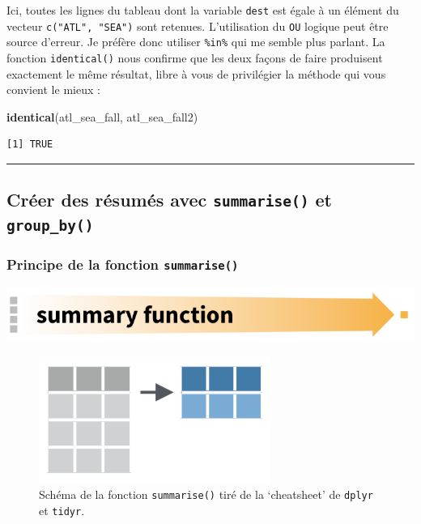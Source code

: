 \documentclass[
  a4paper,
]{article}
\newenvironment{Shaded}{\begin{snugshade}}{\end{snugshade}}
\newcommand{\KeywordTok}[1]{\textcolor[rgb]{0.12,0.11,0.11}{\textbf{#1}}}
\newcommand{\NormalTok}[1]{\textcolor[rgb]{0.12,0.11,0.11}{#1}}
\begin{document}
Ici, toutes les lignes du tableau dont la variable \texttt{dest} est égale à un élément du vecteur \texttt{c("ATL",\ "SEA")} sont retenues. L'utilisation du \texttt{OU} logique peut être source d'erreur. Je préfère donc utiliser \texttt{\%in\%} qui me semble plus parlant. La fonction \texttt{identical()} nous confirme que les deux façons de faire produisent exactement le même résultat, libre à vous de privilégier la méthode qui vous convient le mieux :

\begin{Shaded}
\begin{Highlighting}[]
\KeywordTok{identical}\NormalTok{(atl_sea_fall, atl_sea_fall2)}
\end{Highlighting}
\end{Shaded}

\begin{verbatim}
[1] TRUE
\end{verbatim}

\begin{center}\rule{0.5\linewidth}{0.5pt}\end{center}

\hypertarget{cruxe9er-des-ruxe9sumuxe9s-avec-summarise-et-group_by}{%
\subsection{\texorpdfstring{Créer des résumés avec \texttt{summarise()} et \texttt{group\_by()}}{Créer des résumés avec summarise() et group\_by()}}\label{cruxe9er-des-ruxe9sumuxe9s-avec-summarise-et-group_by}}

\hypertarget{principe-de-la-fonction-summarise}{%
\subsubsection{\texorpdfstring{Principe de la fonction \texttt{summarise()}}{Principe de la fonction summarise()}}\label{principe-de-la-fonction-summarise}}

\begin{center}\includegraphics[width=0.7\linewidth]{images/summarizearrow} \end{center}

\begin{figure}[htpb]

{\centering \includegraphics[width=0.4\linewidth]{images/summarize} 

}

\caption{Schéma de la fonction \texttt{summarise()} tiré de la `cheatsheet' de \texttt{dplyr} et \texttt{tidyr}.}\label{fig:summarisefig2}
\end{figure}
\end{document}
